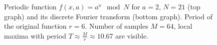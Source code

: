 \begin{figure}
\centering




\caption{Periodic function
  $f\left(x, a\right) = a^x \mod{N}$ for $a=2$, $N = 21$ (top
  graph) and its discrete Fourier transform (bottom graph).
  Period of the original function $r = 6$. Number of samples $M = 64$, 
  local maxima with period $T \approx \frac{M}{r} \approx 10.67$ are visible.}
\label{picAddFourierFourier}
\end{figure}
